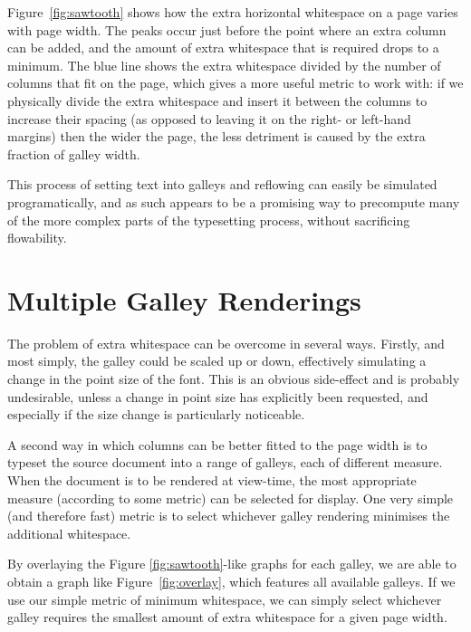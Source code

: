 Figure~\ref{fig:sawtooth} shows how the extra horizontal whitespace on a page varies with page width. The peaks occur just before the point where an extra column can be added, and the amount of extra whitespace that is required drops to a minimum. The blue line shows the extra whitespace divided by the number of columns that fit on the page, which gives a more useful metric to work with: if we physically divide the extra whitespace and insert it between the columns to increase their spacing (as opposed to leaving it on the right- or left-hand margins) then the wider the page, the less detriment is caused by the extra fraction of galley width.

This process of setting text into galleys and reflowing can easily be simulated programatically, and as such appears to be a promising way to precompute many of the more complex parts of the typesetting process, without sacrificing flowability.

\section{Multiple Galley Renderings}
\label{sec:multigalleymetric}
The problem of extra whitespace can be overcome in several ways. Firstly, and most simply, the galley could be scaled up or down, effectively simulating a change in the point size of the font. This is an obvious side-effect and is probably undesirable, unless a change in point size has explicitly been requested, and especially if the size change is particularly noticeable.

A second way in which columns can be better fitted to the page width is to typeset the source document into a range of galleys, each of different \gls{measure}. When the document is to be rendered at view-time, the most appropriate measure (according to some metric) can be selected for display. One very simple (and therefore fast) metric is to select whichever galley rendering minimises the additional whitespace.

By overlaying the Figure \mbox{\ref{fig:sawtooth}-like} graphs for each galley, we are able to obtain a graph like Figure~\ref{fig:overlay}, which features all available galleys. If we use our simple metric of minimum whitespace, we can simply select whichever galley requires the smallest amount of extra whitespace for a given page width.

